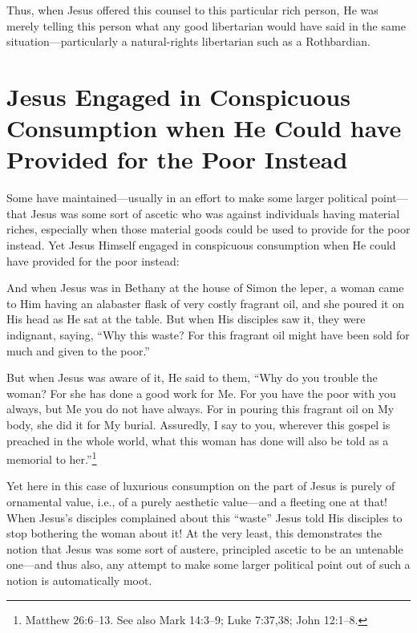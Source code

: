\documentclass[letterpaper,12pt]{article}
\newenvironment{squotation}
  {\small\quotation}
  {\endquotation\normalsize}
\begin{document}
Thus, when Jesus offered this counsel to this particular rich person, He was merely telling this person what any good libertarian would have said in the same situation---particularly a natural-rights libertarian such as a Rothbardian.

\section{Jesus Engaged in Conspicuous Consumption when He Could have Provided for the Poor Instead}
\label{sec:JesusEngagedInConspicuousConsumptionWhenHeCouldHaveProvidedForThePoorInstead}

Some have maintained---usually in an effort to make some larger political point---that Jesus was some sort of ascetic who was against individuals having material riches, especially when those material goods could be used to provide for the poor instead. Yet Jesus Himself engaged in conspicuous consumption when He could have provided for the poor instead:

\begin{squotation}
And when Jesus was in Bethany at the house of Simon the leper, a woman came to Him having an alabaster flask of very costly fragrant oil, and she poured it on His head as He sat at the table. But when His disciples saw it, they were indignant, saying, ``Why this waste? For this fragrant oil might have been sold for much and given to the poor.''

But when Jesus was aware of it, He said to them, ``Why do you trouble the woman? For she has done a good work for Me. For you have the poor with you always, but Me you do not have always. For in pouring this fragrant oil on My body, she did it for My burial. Assuredly, I say to you, wherever this gospel is preached in the whole world, what this woman has done will also be told as a memorial to her.''\footnote{Matthew 26:6--13. See also Mark 14:3--9; Luke 7:37,38; John 12:1--8.}
\end{squotation}

Yet here in this case of luxurious consumption on the part of Jesus is purely of ornamental value, i.e., of a purely aesthetic value---and a fleeting one at that! When Jesus's disciples complained about this ``waste'' Jesus told His disciples to stop bothering the woman about it! At the very least, this demonstrates the notion that Jesus was some sort of austere, principled ascetic to be an untenable one---and thus also, any attempt to make some larger political point out of such a notion is automatically moot.
\end{document}
